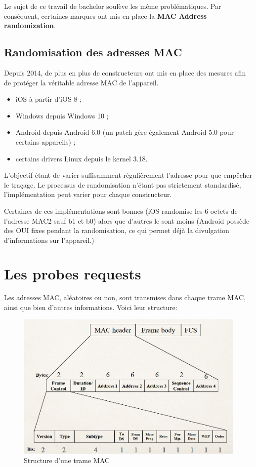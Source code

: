 Le sujet de ce travail de bachelor soulève les même problématiques. Par conséquent, certaines marques
ont mis en place la \textbf{MAC Address randomization}.

\subsection{Randomisation des adresses MAC~\cite{connected:macrandom}}

Depuis 2014, de plus en plus de constructeurs ont mis en place des mesures
afin de protéger la véritable adresse MAC de l'appareil. 

\begin{itemize}
    \item iOS à partir d’iOS 8 ;
    \item Windows depuis Windows 10 ;
    \item Android depuis Android 6.0 (un patch gère également Android 5.0 pour certains appareils) ;
    \item certains drivers Linux depuis le kernel 3.18.
\end{itemize}

L'objectif étant de varier suffisamment régulièrement l'adresse pour que empêcher le traçage. 
Le processus de randomisation n'étant pas strictement standardisé, l'implémentation peut varier pour chaque constructeur. 

Certaines de ces implémentations sont bonnes (iOS randomise les 6 octets de l'adresse MAC2 sauf b1 et b0) alors que d'autres le sont moins (Android possède des OUI fixes pendant la randomisation, ce qui 
permet déjà la divulgation d'informations sur l'appareil.)

\section{Les probes requests}

Les adresses MAC, aléatoires ou non, sont transmises dans chaque trame MAC, ainsi que bien d'autres
informations. Voici leur structure:

\begin{figure}[H]
	\centering
	\includegraphics[width=14cm]{images/probe/mac_frame.png}
	\caption{Structure d'une trame MAC}
	\label{fig:macframe}
\end{figure}

